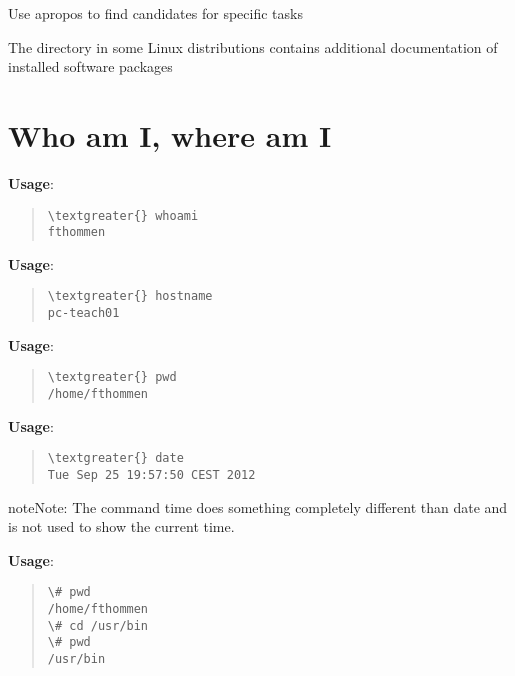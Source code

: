 \documentclass[letterpaper,10pt,english]{sphinxmanual}
\begin{document}
Use apropos to find candidates for specific tasks

The  directory in some Linux distributions contains additional documentation of installed software packages


\section{Who am I, where am I}
\label{introduction:who-am-i-where-am-i}
\textbf{Usage}: 
\begin{quote}

\begin{Verbatim}[commandchars=\\\{\}]
\textgreater{} whoami
fthommen
\end{Verbatim}
\end{quote}

\textbf{Usage}: 
\begin{quote}

\begin{Verbatim}[commandchars=\\\{\}]
\textgreater{} hostname
pc-teach01
\end{Verbatim}
\end{quote}

\textbf{Usage}: 
\begin{quote}

\begin{Verbatim}[commandchars=\\\{\}]
\textgreater{} pwd
/home/fthommen
\end{Verbatim}
\end{quote}

\textbf{Usage}: 
\begin{quote}

\begin{Verbatim}[commandchars=\\\{\}]
\textgreater{} date
Tue Sep 25 19:57:50 CEST 2012
\end{Verbatim}
\end{quote}

\begin{notice}{note}{Note:}
The command time does something completely different than date and is not used to show the current time.
\end{notice}

\textbf{Usage}: 
\begin{quote}

\begin{Verbatim}[commandchars=\\\{\}]
\# pwd
/home/fthommen
\# cd /usr/bin
\# pwd
/usr/bin
\end{Verbatim}
\end{quote}
\end{document}
